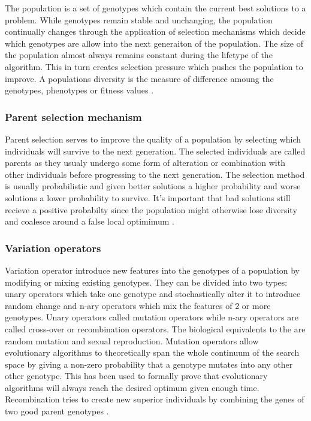 The population is a set of genotypes which contain the current best solutions to a problem. While genotypes remain stable and unchanging, the population continually changes through the application of selection mechanisms which decide which genotypes are allow into the next generaiton of the population. The size of the population almost always remains constant during the lifetype of the algorithm. This in turn creates selection pressure which pushes the population to improve. A populations diversity is the measure of difference amoung the genotypes, phenotypes or fitness values \cite{Eiben2015_whatevolutionary}.

\subsubsection{Parent selection mechanism}

Parent selection serves to improve the quality of a population by selecting which individuals will survive to the next generation. The selected individuals are called parents as they usualy undergo some form of alteration or combination with other individuals before progressing to the next generation. The selection method is usually probabilistic and given better solutions a higher probability and worse solutions a lower probability to survive. It's important that bad solutions still recieve a positive probabilty since the population might otherwise lose diversity and coalesce around a false local optimimum \cite{Eiben2015_whatevolutionary}.

\subsubsection{Variation operators}

Variation operator introduce new features into the genotypes of a population by modifying or mixing existing genotypes. They can be divided into two types: unary operators which take one genotype and stochastically alter it to introduce random change and n-ary operators which mix the features of 2 or more genotypes. Unary operators called mutation operators while n-ary operators are called cross-over or recombination operators. The biological equivalents to the are random mutation and sexual reproduction. Mutation operators allow evolutionary algorithms to theoretically span the whole continuum of the search space by giving a non-zero probability that a genotype mutates into any other other genotype. This has been used to formally prove that evolutionary algorithms will always reach the desired optimum given enough time. Recombination tries to create new superior individuals by combining the genes of two good parent genotypes \cite{Eiben2015_whatevolutionary, Eiben20021}.


